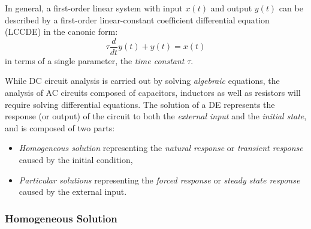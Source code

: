\documentclass{article}
\begin{document}
In general, a first-order linear system with input $x(t)$ and output
$y(t)$ can be described by a first-order linear-constant coefficient 
differential equation (LCCDE) in the canonic form:
\begin{equation}
  \tau\frac{d}{dt}y(t)+y(t)=x(t)
\end{equation}
in terms of a single parameter, the {\em time constant} $\tau$.

While DC circuit analysis is carried out by solving {\em algebraic} 
equations, the analysis of AC circuits composed of capacitors, inductors 
as well as resistors will require solving differential equations. The 
solution of a DE represents the response (or output) of the circuit to 
both the {\em external input} and the {\em initial state}, and is composed 
of two parts:
\begin{itemize}
\item {\em Homogeneous solution} representing the {\em natural response} or
  {\em transient response} caused by the initial condition,
\item {\em Particular solutions} representing the {\em forced response} or
  {\em steady state response} caused by the external input.
\end{itemize} 

\subsubsection*{Homogeneous Solution}
\end{document}
